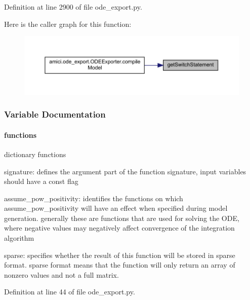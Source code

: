 Definition at line 2900 of file ode\+\_\+export.\+py.

Here is the caller graph for this function\+:
\nopagebreak
\begin{figure}[H]
\begin{center}
\leavevmode
\includegraphics[width=350pt]{namespaceamici_1_1ode__export_a31691c711bc7cb4e3a3c32d39815ac89_icgraph}
\end{center}
\end{figure}


\subsubsection{Variable Documentation}
\mbox{\label{namespaceamici_1_1ode__export_ac310aa598d85b31cc0acea80dcc3c083}} 
\paragraph{\texorpdfstring{functions}{functions}}
{\footnotesize\ttfamily dictionary functions}

signature\+: defines the argument part of the function signature, input variables should have a const flag

assume\+\_\+pow\+\_\+positivity\+: identifies the functions on which assume\+\_\+pow\+\_\+positivity will have an effect when specified during model generation. generally these are functions that are used for solving the O\+DE, where negative values may negatively affect convergence of the integration algorithm

sparse\+: specifies whether the result of this function will be stored in sparse format. sparse format means that the function will only return an array of nonzero values and not a full matrix. 

Definition at line 44 of file ode\+\_\+export.\+py.

\mbox{\label{namespaceamici_1_1ode__export_aa54a407fede674f20bf6ba67fe27177d}} 
